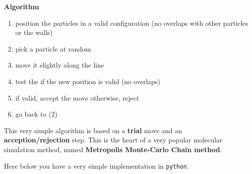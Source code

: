 \documentclass[
  letterpaper,
  enabledeprecatedfontcommands]{report}
\providecommand{\tightlist}{%
  \setlength{\itemsep}{0pt}\setlength{\parskip}{0pt}}
\begin{document}
\begin{tcolorbox}[enhanced jigsaw, leftrule=.75mm, bottomrule=.15mm, colback=white, colframe=quarto-callout-note-color-frame, arc=.35mm, breakable, rightrule=.15mm, left=2mm, opacityback=0, toprule=.15mm]
\begin{minipage}[t]{5.5mm}
\textcolor{quarto-callout-note-color}{\faInfo}
\end{minipage}%
\begin{minipage}[t]{\textwidth - 5.5mm}

\vspace{-3mm}\textbf{Algorithm}\vspace{3mm}

\begin{enumerate}
\def\labelenumi{\arabic{enumi}.}
\tightlist
\item
  position the particles in a valid configuration (no overlaps with
  other particles or the walls)
\item
  pick a particle at random
\item
  move it slightly along the line
\item
  test the if the new position is valid (no overlaps)
\item
  if valid, accept the move otherwise, reject
\item
  go back to (2)
\end{enumerate}

\end{minipage}%
\end{tcolorbox}

This very simple algorithm is based on a \textbf{trial} move and an
\textbf{acception/rejection} step. This is the heart of a very popular
molecular simulation method, named \textbf{Metropolis Monte-Carlo Chain
method}.

Here below you have a very simple implementation in \texttt{python}.
\end{document}
